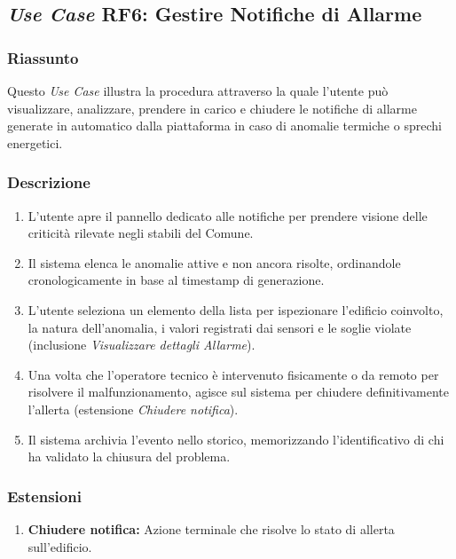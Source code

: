     \subsection*{\textit{Use Case} RF6: Gestire Notifiche di Allarme}
        \subsubsection*{Riassunto}
            Questo \textit{Use Case} illustra la procedura attraverso la quale l'utente può visualizzare, analizzare, prendere in carico e chiudere le notifiche di allarme generate in automatico dalla piattaforma in caso di anomalie termiche o sprechi energetici.
        \subsubsection*{Descrizione}
            \begin{enumerate}
                \item L'utente apre il pannello dedicato alle notifiche per prendere visione delle criticità rilevate negli stabili del Comune.
                \item Il sistema elenca le anomalie attive e non ancora risolte, ordinandole cronologicamente in base al timestamp di generazione.
                \item L'utente seleziona un elemento della lista per ispezionare l'edificio coinvolto, la natura dell'anomalia, i valori registrati dai sensori e le soglie violate (inclusione \textit{Visualizzare dettagli Allarme}).
                \item Una volta che l'operatore tecnico è intervenuto fisicamente o da remoto per risolvere il malfunzionamento, agisce sul sistema per chiudere definitivamente l'allerta (estensione \textit{Chiudere notifica}).
                \item Il sistema archivia l'evento nello storico, memorizzando l'identificativo di chi ha validato la chiusura del problema.
            \end{enumerate}
        \subsubsection*{Estensioni}
            \begin{enumerate}
                \item \textbf{Chiudere notifica:} Azione terminale che risolve lo stato di allerta sull'edificio.
            \end{enumerate}
